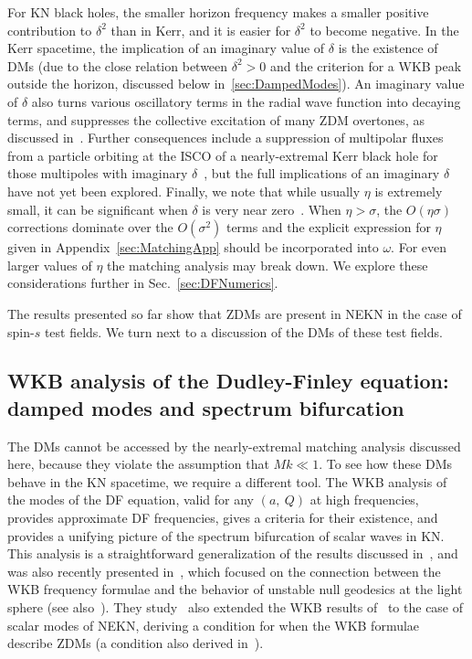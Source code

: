 \begin{refsection}
For KN black holes, the smaller horizon frequency makes a smaller positive contribution to $\delta^2$ than in Kerr, and it is easier for $\delta^2$ to become negative.
In the Kerr spacetime, the implication of an imaginary value of $\delta$ is the existence of DMs (due to the close relation between $\delta^2 > 0$ and the criterion for a WKB peak outside the horizon, discussed below in~\ref{sec:DampedModes}). An imaginary value of $\delta$ also turns various oscillatory terms in the radial wave function into decaying terms, and suppresses the collective excitation of many ZDM overtones, as discussed in~\cite{Andersson2000,Glampedakis2001,Yang:2013uba}. 
Further consequences include a suppression of multipolar fluxes from a particle orbiting at the ISCO of a nearly-extremal Kerr black hole for those multipoles with imaginary $\delta$~\cite{Gralla:2015rpa}, but the full implications of an imaginary $\delta$ have not yet been explored. 
Finally, we note that while usually $\eta$ is extremely small, it can be significant when $\delta$ is very near zero~\cite{Yang:2013uba}.
When $\eta > \sigma$, the $O(\eta \sigma)$ corrections dominate over the $O(\sigma^2)$ terms and the explicit expression for $\eta$ given in Appendix~\ref{sec:MatchingApp} should be incorporated into $\omega$. For even larger values of $\eta$ the matching analysis may break down.
We explore these considerations further in Sec.~\ref{sec:DFNumerics}.

The results presented so far show that ZDMs are present in NEKN in the case of spin-$s$ test fields. We turn next to a discussion of the DMs of these test fields.

\subsection{WKB analysis of the Dudley-Finley equation: damped modes and spectrum bifurcation}
\label{sec:WKBanalysis}

The DMs cannot be accessed by the nearly-extremal matching analysis discussed here, because they violate the assumption that $M k \ll 1$. To see how these DMs behave in the KN spacetime, we require a different tool. 
The WKB analysis of the modes of the DF equation, valid for any $(a,\ Q)$ at high frequencies, provides approximate DF frequencies, gives a criteria for their existence, and provides a unifying picture of the spectrum bifurcation of scalar waves in KN. 
This analysis is a straightforward generalization of the results discussed in~\cite{Yang:2012he}, and was also recently presented in~\cite{Zhao:2015pqa}, which focused on the connection between the WKB frequency formulae and the behavior of unstable null geodesics at the light sphere (see also~\cite{Berti:2005eb}). 
They study~\cite{HodEikonal2012} also extended the WKB results of~\cite{Yang:2012pj,Yang:2013uba} to the case of scalar modes of NEKN, deriving a condition for when the WKB formulae describe ZDMs (a condition also derived in~\cite{Zhao:2015pqa}).


\end{refsection}
